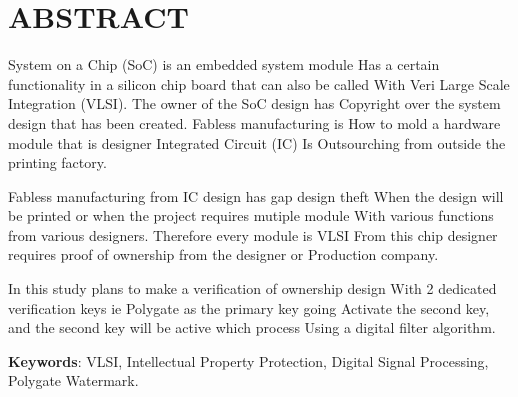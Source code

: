\chapter*{ABSTRACT}

\noindent System on a Chip (SoC) is an embedded system module
Has a certain functionality in a silicon chip board that can also be called
With Veri Large Scale Integration (VLSI). The owner of the SoC design has
Copyright over the system design that has been created. Fabless manufacturing is
How to mold a hardware module that is designer Integrated Circuit (IC)
Is Outsourching from outside the printing factory.

\vspace*{0.5cm}
\noindent Fabless manufacturing from IC design has gap design theft
When the design will be printed or when the project requires mutiple module
With various functions from various designers. Therefore every module is VLSI
From this chip designer requires proof of ownership from the designer or
Production company.

\vspace*{0.5cm}
\noindent In this study plans to make a verification of ownership design
With 2 dedicated verification keys ie Polygate as the primary key going
Activate the second key, and the second key will be active which process
Using a digital filter algorithm.

\vspace*{0.5cm}

\noindent \textbf{Keywords}: VLSI, Intellectual Property Protection, Digital Signal Processing, Polygate Watermark.

\newpage